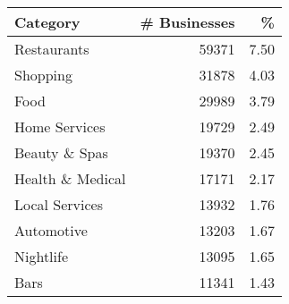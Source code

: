 \begin{tabular}{lrr}
\toprule
         Category &  \# Businesses &     \% \\
\midrule
      Restaurants &         59371 &  7.50 \\
         Shopping &         31878 &  4.03 \\
             Food &         29989 &  3.79 \\
    Home Services &         19729 &  2.49 \\
    Beauty \& Spas &         19370 &  2.45 \\
 Health \& Medical &         17171 &  2.17 \\
   Local Services &         13932 &  1.76 \\
       Automotive &         13203 &  1.67 \\
        Nightlife &         13095 &  1.65 \\
             Bars &         11341 &  1.43 \\
\bottomrule
\end{tabular}
